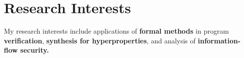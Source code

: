 

\section{Research Interests}

My research interests include applications of {\bf formal methods} in program {\bf verification}, 
{\bf synthesis for hyperproperties}, and analysis of {\bf information-flow security.}\\

